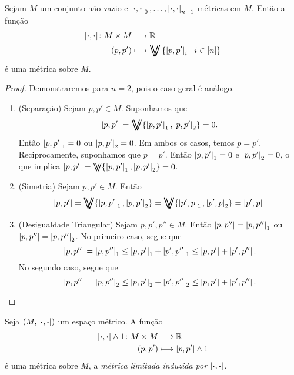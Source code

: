 \begin{proposition}
Sejam $M$ um conjunto não vazio e $\left\vert{\bm{\cdot}},{\bm{\cdot}}\right\vert_0, \ldots,\left\vert{\bm{\cdot}},{\bm{\cdot}}\right\vert_{n-1}$ métricas em $M$. Então a função
	\begin{align*}
	\func{\dist{\var}{\var}}{M \times M}{\R}{(p,p')}{\max\set{\dist{p}{p'}_i}{i \in [n]}}
	\end{align*}
é uma métrica sobre $M$.
\end{proposition}
\begin{proof}
Demonstraremos para $n=2$, pois o caso geral é análogo.
	\begin{enumerate}
	\item (Separação) Sejam $p,p' \in M$. Suponhamos que
	\begin{equation*}
	\dist{p}{p'}=\max\{\dist{p}{p'}_1,\dist{p}{p'}_2\}=0.
	\end{equation*}
Então $\left\vert{p},{p'}\right\vert_1=0$ ou $\left\vert{p},{p'}\right\vert_2=0$. Em ambos os casos, temos $p=p'$. Reciprocamente, suponhamos que $p=p'$. Então $\left\vert{p},{p'}\right\vert_1=0$ e $\left\vert{p},{p'}\right\vert_2=0$, o que implica $\dist{p}{p'}=\max\{\dist{p}{p'}_1,\dist{p}{p'}_2\}=0$.
	
	\item (Simetria) Sejam $p,p' \in M$. Então
	\begin{equation*}
	\dist{p}{p'} = \max\{\dist{p}{p'}_1,\dist{p}{p'}_2\} = \max\{\dist{p'}{p}_1,\dist{p'}{p}_2\} = \dist{p'}{p}.
	\end{equation*}
	
	\item (Desigualdade Triangular) Sejam $p,p',p'' \in M$. Então $\left\vert{p},{p''}\right\vert=\left\vert{p},{p''}\right\vert_1$ ou $\left\vert{p},{p''}\right\vert=\left\vert{p},{p''}\right\vert_2$. No primeiro caso, segue que
	\begin{equation*}
	\left\vert{p},{p''}\right\vert = \left\vert{p},{p''}\right\vert_1 \leq \left\vert{p},{p'}\right\vert_1 + \left\vert{p'},{p''}\right\vert_1 \leq \left\vert{p},{p'}\right\vert + \left\vert{p'},{p''}\right\vert.
	\end{equation*}
	No segundo caso, segue que
	\begin{equation*}
	\left\vert{p},{p''}\right\vert = \left\vert{p},{p''}\right\vert_2 \leq \left\vert{p},{p'}\right\vert_2 + \left\vert{p'},{p''}\right\vert_2 \leq \left\vert{p},{p'}\right\vert + \left\vert{p'},{p''}\right\vert. \qedhere
	\end{equation*}
	\end{enumerate}
\end{proof}

\begin{exercise}
Seja $(M,\left\vert{\bm{\cdot}},{\bm{\cdot}}\right\vert)$ um espaço métrico. A função
	\begin{align*}
	{\left\vert{\bm{\cdot}},{\bm{\cdot}}\right\vert \mathbin{\wedge}1}\colon {M \times M} &\longrightarrow {\mathbb{R}} \\{(p,p')} &\longmapsto \left\vert{p},{p'}\right\vert \mathbin{\wedge} 1
	\end{align*}
é uma métrica sobre $M$, a \emph{métrica limitada induzida por $\left\vert{\bm{\cdot}},{\bm{\cdot}}\right\vert$}.
\end{exercise}

